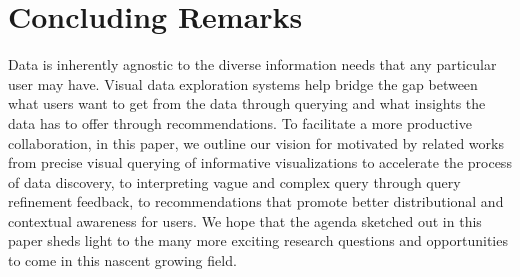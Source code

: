 \section{Concluding Remarks\label{sec:conclusion}}
\par Data is inherently agnostic to the diverse information needs that any particular user may have. Visual data exploration systems help bridge the gap between what users want to get from the data through querying and what insights the data has to offer through recommendations. To facilitate a more productive collaboration, in this paper, we outline our vision for \vida motivated by related works from precise visual querying of informative visualizations to accelerate the process of data discovery, to interpreting vague and complex query through query refinement feedback, to recommendations that promote better distributional and contextual awareness for users. We hope that the agenda sketched out in this paper sheds light to the many more exciting research questions and opportunities to come in this nascent growing field.



